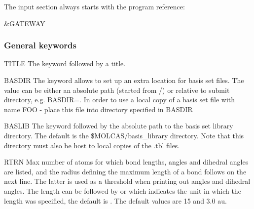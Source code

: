 The  input section always starts with the program reference:
\begin{inputlisting}
 &GATEWAY
\end{inputlisting}

\subsubsection{General keywords}


\begin{keywordlist}
\item[TITLE]
The keyword followed by a title.

\item[BASDIR]
The keyword allows to set up an extra location for basis set files.
The value can be either an absolute path (started from /) or relative to
submit directory, e.g. BASDIR=.
In order to use a local copy of a basis set file with name FOO - place
this file into directory specified in BASDIR

\item[BASLIB]
The keyword followed by the absolute path to the basis set library directory. The default
is the \$MOLCAS/basis\_library directory. Note that this directory must also be host to
local copies of the .tbl files.

\item[RTRN]
Max number of atoms for which bond lengths, angles and dihedral
angles are listed, and
the radius defining the maximum length of a bond follows on
the next line. The latter is used as a threshold when printing out
angles and dihedral angles. The length can be followed by
 or
 which indicates the unit in which the length
was specified, the default is
.
The default values are 15 and 3.0 au.


\end{keywordlist}
